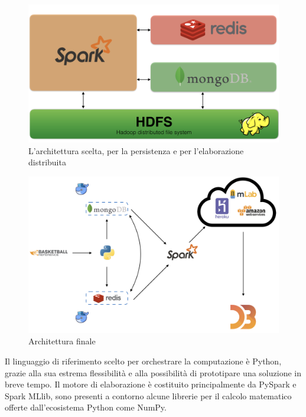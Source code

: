 \documentclass[10pt,a4paper,twocolumn]{article}
\begin{document}
\begin{figure}[h]
	\centering
	\includegraphics[width=\linewidth]{arch}
	\caption{L'architettura scelta, per la persistenza e per l'elaborazione distribuita}
	\label{fig:arch}
\end{figure}

\begin{figure}[h]
	\centering
	\includegraphics[width=0.8\linewidth]{final}
	\caption{Architettura finale}
	\label{fig:finale}
\end{figure}

Il linguaggio di riferimento scelto per orchestrare la computazione è Python, grazie alla sua estrema flessibilità e alla possibilità di prototipare una soluzione in breve tempo. Il motore di elaborazione è costituito principalmente da PySpark e Spark MLlib, sono presenti a contorno alcune librerie per il calcolo matematico offerte dall'ecosistema Python come NumPy.
\end{document}
